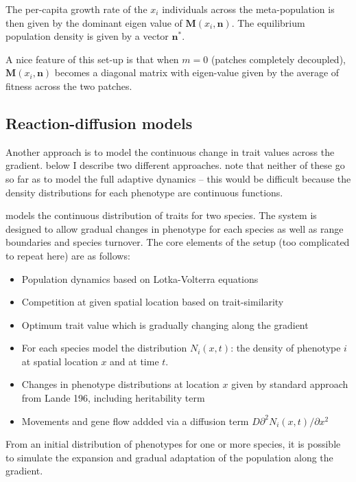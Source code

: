 \documentclass[a4paper,11pt]{article}
\begin{document}
The per-capita growth rate of the $x_i$ individuals across the meta-population is then given by the dominant eigen value of $\mathbf{M}(x_i, \mathbf{n})$. The equilibrium population density is given by a vector $\mathbf{n^*}$.

A nice feature of this set-up is that when $m=0$ (patches completely decoupled), $\mathbf{M}(x_i, \mathbf{n})$ becomes a diagonal matrix with eigen-value given by the average of fitness across the two patches.


\subsection{Reaction-diffusion models}

Another approach is to model the continuous change in trait values across the gradient. below I describe two different approaches. note that neither of these go so far as to model the full adaptive dynamics --  this would be difficult because the density distributions for each phenotype are continuous functions.

\citet{Case-2000} models the continuous distribution of traits for two species. The system is designed to allow gradual changes in phenotype for each species as well as range boundaries and species turnover.  The core elements of the setup (too complicated to repeat here) are as follows:
\begin{itemize}
  \item Population dynamics based on Lotka-Volterra equations
  \item Competition at given spatial location based on trait-similarity
  \item Optimum trait value which is gradually changing along the gradient
  \item For each species model the distribution $N_i(x,t)$: the density of phenotype $i$ at spatial location $x$ and at time $t$.
  \item Changes in phenotype distributions at location $x$ given by standard approach from Lande 196, including heritability term
  \item Movements and gene flow addded via a diffusion term $D\partial ^2 N_i(x,t)/ \partial x^2$
\end{itemize}
From an initial distribution of phenotypes for one or more species, it is possible to simulate the expansion and gradual adaptation of the population along the gradient.
\end{document}

